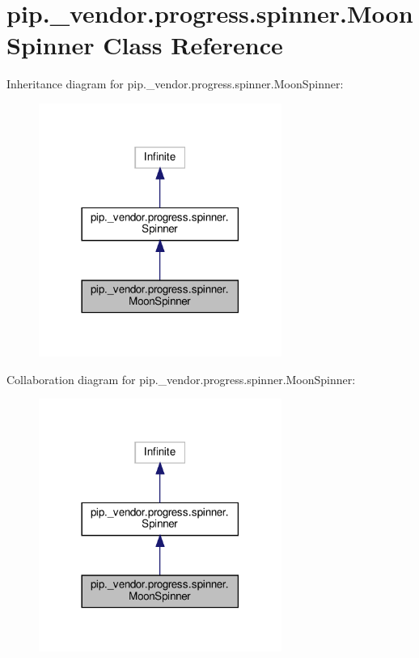 \hypertarget{classpip_1_1__vendor_1_1progress_1_1spinner_1_1MoonSpinner}{}\section{pip.\+\_\+vendor.\+progress.\+spinner.\+Moon\+Spinner Class Reference}
\label{classpip_1_1__vendor_1_1progress_1_1spinner_1_1MoonSpinner}


Inheritance diagram for pip.\+\_\+vendor.\+progress.\+spinner.\+Moon\+Spinner\+:
\nopagebreak
\begin{figure}[H]
\begin{center}
\leavevmode
\includegraphics[width=225pt]{classpip_1_1__vendor_1_1progress_1_1spinner_1_1MoonSpinner__inherit__graph}
\end{center}
\end{figure}


Collaboration diagram for pip.\+\_\+vendor.\+progress.\+spinner.\+Moon\+Spinner\+:
\nopagebreak
\begin{figure}[H]
\begin{center}
\leavevmode
\includegraphics[width=225pt]{classpip_1_1__vendor_1_1progress_1_1spinner_1_1MoonSpinner__coll__graph}
\end{center}
\end{figure}
